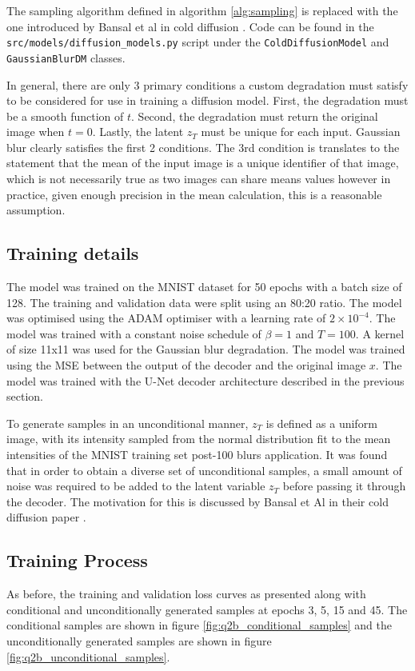 \documentclass[11pt]{article}
\begin{document}
The sampling algorithm defined in algorithm \ref{alg:sampling} is replaced with the one introduced by Bansal et al in cold diffusion \cite{bansal2022cold}. Code can be found in the \texttt{src/models/diffusion\_models.py} script under the \texttt{ColdDiffusionModel} and \texttt{GaussianBlurDM} classes.

In general, there are only 3 primary conditions a custom degradation must satisfy to be considered for use in training a diffusion model.
First, the degradation must be a smooth function of $t$. Second, the degradation must return the original image when $t=0$. Lastly, the latent $z_T$ must be unique for each input. Gaussian blur clearly satisfies the first 2 conditions. The 3rd condition is translates to the statement that the mean of the input image is a unique identifier of that image, which is not necessarily true as two images can share means values however in practice, given enough precision in the mean calculation, this is a reasonable assumption.

\subsection{Training details}
The model was trained on the MNIST dataset for 50 epochs with a batch size of 128. The training and validation data were split using an 80:20 ratio. The model was optimised using the ADAM optimiser with a learning rate of $2 \times 10^{-4}$. The model was trained with a constant noise schedule of $\beta = 1$ and $T=100$. A kernel of size 11x11 was used for the Gaussian blur degradation. The model was trained using the MSE between the output of the decoder and the original image $x$. The model was trained with the U-Net decoder architecture described in the previous section.

To generate samples in an unconditional manner, $z_T$ is defined as a uniform image, with its intensity sampled from the normal distribution fit to the mean intensities of the MNIST training set post-100 blurs application. It was found that in order to obtain a diverse set of unconditional samples, a small amount of noise was required to be added to the latent variable $z_T$ before passing it through the decoder. The motivation for this is discussed by Bansal et Al in their cold diffusion paper \cite{bansal2022cold}.
\subsection{Training Process}
As before, the training and validation loss curves as presented along with conditional and unconditionally generated samples at epochs 3, 5, 15 and 45. The conditional samples are shown in figure \ref{fig:q2b_conditional_samples} and the unconditionally generated samples are shown in figure
\ref{fig:q2b_unconditional_samples}.
\end{document}
